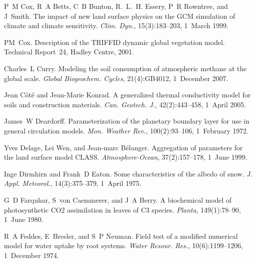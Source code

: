 \begin{DoxyDescription}
\item[\label{_CITEREF_Cox1999-ia}%
\mbox{[}24\mbox{]}]P~M Cox, R~A Betts, C~B Bunton, R.~L.~H. Essery, P~R Rowntree, and J~Smith. The impact of new land surface physics on the G\+C\+M simulation of climate and climate sensitivity. {\itshape Clim. Dyn.}, 15(3)\+:183--203, 1~March 1999. 


\item[\label{_CITEREF_Cox2001-am}%
\mbox{[}25\mbox{]}]P\+M~Cox. Description of the T\+R\+I\+F\+F\+I\+D dynamic global vegetation model. Technical Report~24, Hadley Centre, 2001.


\item[\label{_CITEREF_Curry2007-du}%
\mbox{[}26\mbox{]}]Charles~L Curry. Modeling the soil consumption of atmospheric methane at the global scale. {\itshape Global Biogeochem. Cycles}, 21(4)\+:G\+B4012, 1~December 2007. 


\item[\label{_CITEREF_Cote2005-ew}%
\mbox{[}27\mbox{]}]Jean Côté and Jean-\/\+Marie Konrad. A generalized thermal conductivity model for soils and construction materials. {\itshape Can. Geotech. J.}, 42(2)\+:443--458, 1~April 2005. 


\item[\label{_CITEREF_Deardorff1972-ay}%
\mbox{[}28\mbox{]}]James~W Deardorff. Parameterization of the planetary boundary layer for use in general circulation models. {\itshape Mon. Weather Rev.}, 100(2)\+:93--106, 1~February 1972. 


\item[\label{_CITEREF_Delage1999-vj}%
\mbox{[}29\mbox{]}]Yves Delage, Lei Wen, and Jean‐marc Bélanger. Aggregation of parameters for the land surface model C\+L\+A\+S\+S. {\itshape Atmosphere-\/\+Ocean}, 37(2)\+:157--178, 1~June 1999. 


\item[\label{_CITEREF_Dirmhirn1975-vx}%
\mbox{[}30\mbox{]}]Inge Dirmhirn and Frank~D Eaton. Some characteristics of the albedo of snow. {\itshape J. Appl. Meteorol.}, 14(3)\+:375--379, 1~April 1975. 


\item[\label{_CITEREF_Farquhar1980-96e}%
\mbox{[}31\mbox{]}]G~D Farquhar, S~von Caemmerer, and J~A Berry. A biochemical model of photosynthetic C\+O2 assimilation in leaves of C3 species. {\itshape Planta}, 149(1)\+:78--90, 1~June 1980. 


\item[\label{_CITEREF_Feddes1974-ff}%
\mbox{[}32\mbox{]}]R~A Feddes, E~Bresler, and S~P Neuman. Field test of a modified numerical model for water uptake by root systems. {\itshape Water Resour. Res.}, 10(6)\+:1199--1206, 1~December 1974. 



\end{DoxyDescription}
